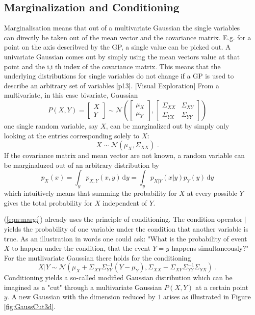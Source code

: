 \documentclass[%
  a4paper,oneside,%
  11pt,%
  smallchapters,
  green,%
  rgb, <cmyk>
  ]{tubsbook}
\begin{document}
\subsection{Marginalization and Conditioning} 
\label{sec:Marg}
Marginalisation means that out of a multivariate Gaussian the single variables can directly be taken out of the mean vector and the covariance matrix. E.g. for a point on the axis describved by the GP, a single value can be picked out. A univariate Gaussian comes out by simply using the mean vectors value at that point and the i,i th index of the covariance matrix. This means that the underlying distributions for single variables do not change if a GP is used to describe an arbitrary set of variables [p13].
[Visual Exploration]
From a multivariate, in this case bivariate, Gaussian
\begin{equation}
P(X,Y) = \begin{bmatrix}
           X \\
           Y
         \end{bmatrix} \sim \mathcal{N}\left( \begin{bmatrix}
           \mu_X \\
           \mu_Y
         \end{bmatrix}, \begin{bmatrix}
\Sigma_{XX} & \Sigma_{XY} \\
\Sigma_{YX} & \Sigma_{YY} 
\end{bmatrix}  \right)
\end{equation}
one single random variable, say $X$, can be marginalized out by simply only looking at the entries corresponding solely to $X$:
\begin{equation}
X \sim \mathcal{N}(\mu_X, \Sigma_{XX}) \;.
\end{equation}
If the covariance matrix and mean vector are not known, a random variable can be marginaluzed out of an arbitrary distribution by
\begin{equation}
p_X(x) = \int_y p_{X,Y}(x,y)\,\mathrm{d}y = \int_y p_{X|Y}(x|y)p_Y(y)\,\mathrm{d}y
\label{eqn:margi}
\end{equation}
which intuitively means that summing the probability for $X$ at every possible $Y$ gives the total probability for $X$ independent of $Y$. 

(\ref{eqn:margi}) already uses the principle of conditioning. The condition operator $|$ yields the probability of one variable under the condition that another variable is true. As an illustration in words one could ask: "What is the probability of event $X$ to happen under the condition, that the event $Y=y$ happens simultaneously?"
For the mutlivariate Gaussian there holds for the conditioning
\begin{equation}
X|Y \sim \mathcal{N}(\mu_X +\Sigma_{XY} \Sigma_{YY}^{-1}(Y-\mu_Y), \Sigma_{XX} - \Sigma_{XY}\Sigma_{YY}^{-1}\Sigma_{YX} ) \;.
\end{equation}
%
Conditioning yields a so-called modified Gaussian distribution which can be imagined as a "cut" through a multivariate Gaussian $P(X,Y)$ at a certain point $y$. A new Gaussian with the dimension reduced by $1$ arises as illustrated in Figure \ref{fig:GaussCut3d}.
\end{document}
